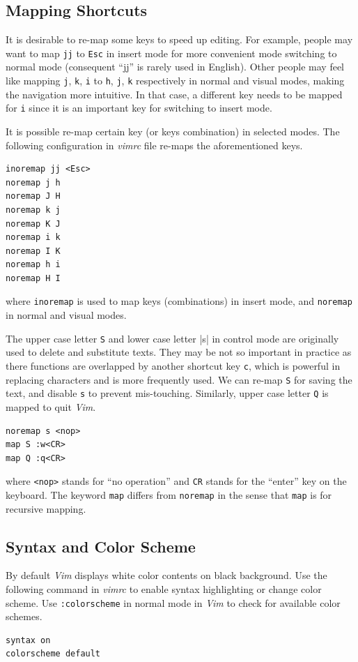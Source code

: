 \subsection{Mapping Shortcuts}

It is desirable to re-map some keys to speed up editing. For example, people may want to map \verb|jj| to \verb|Esc| in insert mode for more convenient mode switching to normal mode (consequent ``jj'' is rarely used in English). Other people may feel like mapping \verb|j|, \verb|k|, \verb|i| to \verb|h|, \verb|j|, \verb|k| respectively in normal and visual modes, making the navigation more intuitive. In that case, a different key needs to be mapped for \verb|i| since it is an important key for switching to insert mode.

It is possible re-map certain key (or keys combination) in selected modes. The following configuration in \textit{vimrc} file re-maps the aforementioned keys.
\begin{lstlisting}
inoremap jj <Esc>
noremap j h
noremap J H
noremap k j
noremap K J
noremap i k
noremap I K
noremap h i
noremap H I
\end{lstlisting}
where \verb|inoremap| is used to map keys (combinations) in insert mode, and \verb|noremap| in normal and visual modes.

The upper case letter \verb|S| and lower case letter |s| in control mode are originally used to delete and substitute texts. They may be not so important in practice as there functions are overlapped by another shortcut key \verb|c|, which is powerful in replacing characters and is more frequently used. We can re-map \verb|S| for saving the text, and disable \verb|s| to prevent mis-touching. Similarly, upper case letter \verb|Q| is mapped to quit \textit{Vim}.
\begin{lstlisting}
noremap s <nop>
map S :w<CR>
map Q :q<CR>
\end{lstlisting}
where \verb|<nop>| stands for ``no operation'' and \verb|CR| stands for the ``enter'' key on the keyboard. The keyword \verb|map| differs from \verb|noremap| in the sense that \verb|map| is for recursive mapping.

\subsection{Syntax and Color Scheme}

By default \textit{Vim} displays white color contents on black background. Use the following command in \textit{vimrc} to enable syntax highlighting or change color scheme. Use \verb|:colorscheme| in normal mode in \textit{Vim} to check for available color schemes.
\begin{lstlisting}
syntax on
colorscheme default
\end{lstlisting}

